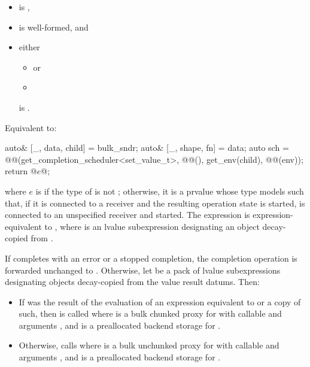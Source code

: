 \begin{itemdescr}
\pnum
\constraints
\begin{itemize}
\item
{} is ,
\item
{} is well-formed, and
\item
either
\begin{itemize}
\item
{} or
\item
{}
\end{itemize}
is .
\end{itemize}

\pnum
\effects
Equivalent to:
\begin{codeblock}
auto& [_, data, child] = bulk_sndr;
auto& [_, shape, fn] = data;
auto sch = @@(get_completion_scheduler<set_value_t>,
                             @@(), get_env(child), @@(env));
return @$e$@;
\end{codeblock}
where $e$ is 
if the type of  is not ;
otherwise, it is a prvalue whose type models  such that,
if it is connected to a receiver  and
the resulting operation state is started,
 is connected to an unspecified receiver  and started.
The expression 
is expression-equivalent to ,
where  is an lvalue subexpression
designating an object decay-copied from .

If  completes with an error or a stopped completion,
the completion operation is forwarded unchanged to .
Otherwise, let  be a pack of lvalue subexpressions
designating objects decay-copied from the value result datums.
Then:
\begin{itemize}
\item
If  was the result of the evaluation of
an expression equivalent to  or
a copy of such,
then  is called
where  is a bulk chunked proxy
for  with callable  and arguments , and
 is a preallocated backend storage for .
\item
Otherwise, calls 
where  is a bulk unchunked proxy for 
with callable  and arguments , and
 is a preallocated backend storage for .
\end{itemize}
\end{itemdescr}

